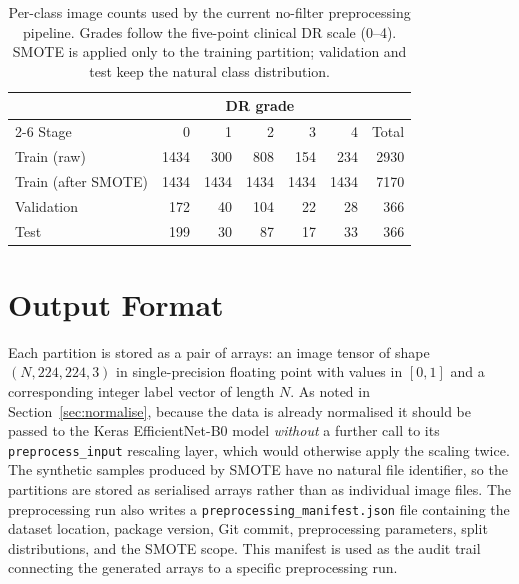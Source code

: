 \documentclass[11pt,a4paper]{article}
\begin{document}
\begin{table}[t]
  \centering
  \caption{Per-class image counts used by the current no-filter preprocessing
  pipeline. Grades follow the five-point clinical DR scale (0--4). SMOTE is
  applied only to the training partition; validation and test keep the natural
  class distribution.}
  \label{tab:counts}
  \begin{tabular}{lrrrrrr}
    \toprule
    & \multicolumn{5}{c}{DR grade} & \\
    \cmidrule(lr){2-6}
    Stage & 0 & 1 & 2 & 3 & 4 & Total \\
    \midrule
    Train (raw)            & 1434 & 300 & 808 & 154 & 234 & 2930 \\
    Train (after SMOTE)    & 1434 & 1434 & 1434 & 1434 & 1434 & 7170 \\
    \midrule
    Validation             & 172 & 40 & 104 & 22 & 28 & 366 \\
    Test                   & 199 & 30 & 87 & 17 & 33 & 366 \\
    \bottomrule
  \end{tabular}
\end{table}

\section{Output Format}
\label{sec:output}

Each partition is stored as a pair of arrays: an image tensor of shape
$(N, 224, 224, 3)$ in single-precision floating point with values in $[0,1]$
and a corresponding integer label vector of length $N$. As noted in
Section~\ref{sec:normalise}, because the data is already normalised it should
be passed to the Keras EfficientNet-B0 model \emph{without} a further call to
its \texttt{preprocess\_input} rescaling layer, which would otherwise apply the
scaling twice. The synthetic samples produced by SMOTE have no natural file
identifier, so the partitions are stored as serialised arrays rather than as
individual image files. The preprocessing run also writes a
\texttt{preprocessing\_manifest.json} file containing the dataset location,
package version, Git commit, preprocessing parameters, split distributions,
and the SMOTE scope. This manifest is used as the audit trail connecting the
generated arrays to a specific preprocessing run.

\end{document}
